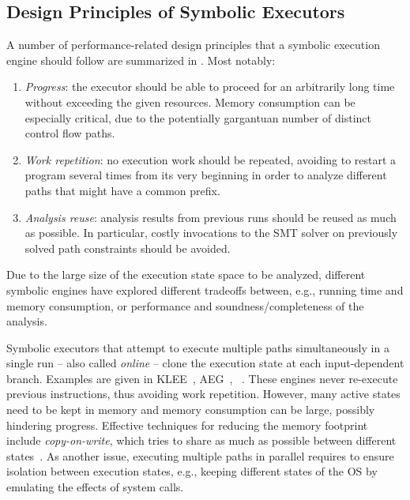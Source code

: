 \subsection{Design Principles of Symbolic Executors}
\label{ss:principles}

A number %
of performance-related design principles that a symbolic execution engine should follow are  summarized in %
\cite{MAYHEM-SP12}. Most notably:
\begin{enumerate}[topsep=5pt,itemsep=2pt]
  \item {\em Progress}: the executor should be able to proceed for an arbitrarily long time without exceeding the given resources. Memory consumption can be especially critical, due to the potentially gargantuan number of distinct control flow paths.
  \item {\em Work repetition}: no execution work should be repeated, avoiding to restart a program several times from its very beginning in order to analyze different paths that might have a  common prefix.
  \item {\em Analysis reuse}: analysis results from previous runs should be reused as much as possible. In particular, costly invocations to the SMT solver on  previously solved path constraints should be avoided.
\end{enumerate}

\noindent Due to the large size of the execution state space to be analyzed, different symbolic engines have explored different tradeoffs between, e.g., running time and memory consumption, or performance and soundness/completeness of the analysis.

Symbolic executors that attempt to execute multiple paths simultaneously in a single run -- also called {\em online} -- clone the execution state at each input-dependent branch. Examples are given in {\sc KLEE}~\cite{KLEE-OSDI08}, {\sc AEG}~\cite{AEG-NDSS11}, {\sc \stwoe}~\cite{CKC-TOCS12}. These engines never re-execute previous instructions, thus avoiding work repetition. However, many active states need to be kept in memory and memory consumption can be large, possibly hindering progress. Effective techniques for reducing the memory footprint include {\em copy-on-write}, which tries to share as much as possible between different states~\cite{KLEE-OSDI08}. As another issue, executing multiple paths in parallel requires to ensure isolation between execution states, e.g., keeping different states of the OS by emulating the effects of system calls.

